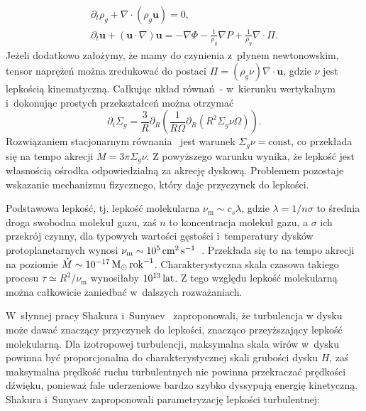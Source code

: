\begin{gather}
   \partial_t \rho_g + \nabla\cdot\left(\rho_g\mathbf{u}\right) = 0,
   \label{eq:ns1}\\
\partial_t \mathbf{u} + \left(\mathbf{u}\cdot\nabla\right)\mathbf{u} = 
-\nabla\Phi -\frac{1}{\rho_g} \nabla P + \frac{1}{\rho_g} \nabla \cdot \Pi.
\label{eq:ns2}
\end{gather}
%
Jeżeli dodatkowo założymy, że mamy do czynienia z~płynem newtonowskim, tensor
naprężeń można zredukować do postaci $\Pi = (\rho_g \nu)\nabla\cdot\mathbf{u}$,
gdzie $\nu$ jest lepkością kinematyczną. Całkując układ
równań~- w~kierunku wertykalnym i~dokonując prostych
przekształceń można otrzymać
\begin{equation}\label{eq:sigma}
   \partial_t \Sigma_g =
   \frac{3}{R}\partial_R\left(\frac{1}{R\Omega}\partial_R\left(R^2\Sigma_g \nu
         \Omega\right)\right).
\end{equation}
Rozwiązaniem stacjonarnym równania~ jest warunek $\Sigma_g\nu =
\textrm{const}$, co przekłada się na tempo akrecji $\dot{M} = 3\pi\Sigma_g\nu$.
Z powyższego warunku wynika, że lepkość jest własnością ośrodka odpowiedzialną
za akrecję dyskową. Problemem pozostaje wskazanie mechanizmu fizycznego, który
daje przyczynek do lepkości.
\par Podstawowa lepkość, tj. lepkość molekularna $\nu_{\textrm{m}} \sim c_s
\lambda$, gdzie $\lambda = 1 / n\sigma$ to średnia droga swobodna molekuł gazu,
zaś $n$ to koncentracja molekuł gazu, a $\sigma$ ich przekrój czynny, dla
typowych wartości gęstości i~temperatury dysków protoplanetarnych wynosi
$\nu_{\textrm{m}}\sim10^5\hbox{$\thinspace\textrm{cm}$}^2\hbox{$\thinspace\textrm{s}$}^{-1}$~\cite{armitage}. Przekłada się to na
tempo akrecji na poziomie $\dot{M}\sim 10^{-17}\hbox{$\mathrm{\thinspace M_{\odot}}$}\hbox{$\thinspace\textrm{rok}$}^{-1}$. 
Charakterystyczna skala czasowa takiego procesu $\tau \simeq R^2 /
\nu_{\textrm{m}}$ wynosiłaby $10^{13}\hbox{$\thinspace\textrm{lat}$}$. Z tego względu lepkość molekularną można
całkowicie zaniedbać w~dalszych rozważaniach.
\par W~słynnej pracy Shakura i~Sunyaev~\citep{SS73} zaproponowali, że turbulencja
w dysku może dawać znaczący przyczynek do lepkości, znacząco przeyższający
lepkość molekularną. Dla izotropowej turbulencji, maksymalna skala wirów w~dysku
powinna być proporcjonalna do charakterystycznej skali grubości dysku $H$, zaś
maksymalna prędkość ruchu turbulentnych nie powinna przekraczać prędkości
dźwięku, ponieważ fale uderzeniowe bardzo szybko dyssypują energię kinetyczną.
Shakura i~Sunyaev zaproponowali parametryzację lepkości turbulentnej:

